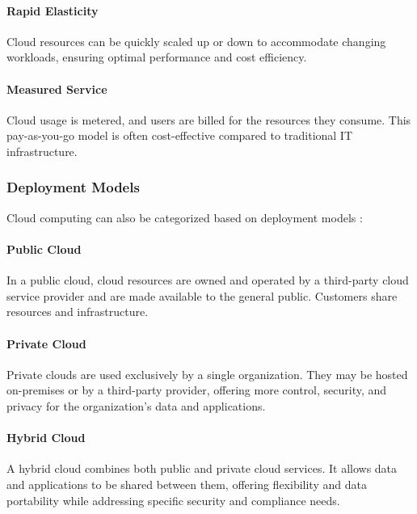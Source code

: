 \paragraph{Rapid Elasticity}

Cloud resources can be quickly scaled up or down to accommodate changing workloads, 
ensuring optimal performance and cost efficiency.

\paragraph{Measured Service} 
Cloud usage is metered, and users are billed for the resources they consume. 
This pay-as-you-go model is often cost-effective compared to traditional IT infrastructure.


\subsubsection{Deployment Models}
Cloud computing can also be categorized based on deployment models \cite{mellNISTDefinitionCloud} \cite{patelCloudComputingDeployment2021}:

\paragraph{Public Cloud}
In a public cloud, cloud resources are owned and operated by a third-party cloud service provider and 
are made available to the general public. 
Customers share resources and infrastructure.

\paragraph{Private Cloud}
Private clouds are used exclusively by a single organization. 
They may be hosted on-premises or by a third-party provider, offering more control, security, 
and privacy for the organization's data and applications.

\paragraph{Hybrid Cloud}
A hybrid cloud combines both public and private cloud services. 
It allows data and applications to be shared between them, 
offering flexibility and data portability while addressing specific security and compliance needs.

